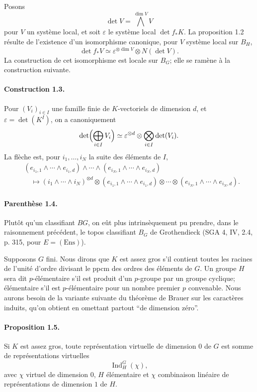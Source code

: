 \documentclass[10pt]{article}
\newcommand{\Ind}{\operatorname{Ind}}
\begin{document}
Posons
\[
\det V=\bigwedge^{\dim V}V
\]
pour \(V\) un système local, et soit \(\varepsilon\) le système local \(\det f_*K\). La proposition 1.2 résulte de l'existence d'un isomorphisme canonique, pour \(V\) système local sur \(B_H\),
\[
\det f_*V\simeq \varepsilon^{\otimes\dim V}\otimes N(\det V).
\]
La construction de cet isomorphisme est locale sur \(B_G\); elle se ramène à la construction suivante.

\paragraph{Construction 1.3.} Pour \((V_i)_{i\in I}\) une famille finie de \(K\)-vectoriels de dimension \(d\), et \(\varepsilon=\det(K^I)\), on a canoniquement
\[
\det\Bigl(\bigoplus_{i\in I}V_i\Bigr)\simeq
\varepsilon^{\otimes d}\otimes\bigotimes_{i\in I}\det(V_i).
\]
La flèche est, pour \(i_1,\ldots,i_N\) la suite des éléments de \(I\),
\[
\begin{aligned}
&(e_{i_1,1}\wedge\cdots\wedge e_{i_1,d})\wedge\cdots\wedge
(e_{i_N,1}\wedge\cdots\wedge e_{i_N,d}) \\
&\quad\longmapsto
(i_1\wedge\cdots\wedge i_N)^{\otimes d}\otimes
(e_{i_1,1}\wedge\cdots\wedge e_{i_1,d})\otimes\cdots\otimes
(e_{i_N,1}\wedge\cdots\wedge e_{i_N,d}).
\end{aligned}
\]

\paragraph{Parenthèse 1.4.} Plutôt qu'un classifiant \(BG\), on eût plus intrinsèquement pu prendre, dans le raisonnement précédent, le topos classifiant \(B_G\) de Grothendieck (SGA 4, IV, 2.4, p. 315, pour \(E=(\mathrm{Ens})\)).

Supposons \(G\) fini. Nous dirons que \(K\) est assez gros s'il contient toutes les racines de l'unité d'ordre divisant le ppcm des ordres des éléments de \(G\). Un groupe \(H\) sera dit \(p\)-élémentaire s'il est produit d'un \(p\)-groupe par un groupe cyclique; élémentaire s'il est \(p\)-élémentaire pour un nombre premier \(p\) convenable. Nous aurons besoin de la variante suivante du théorème de Brauer sur les caractères induits, qu'on obtient en omettant partout ``de dimension zéro''.

\paragraph{Proposition 1.5.} Si \(K\) est assez gros, toute représentation virtuelle de dimension \(0\) de \(G\) est somme de représentations virtuelles
\[
\Ind_H^G(\chi),
\]
avec \(\chi\) virtuel de dimension \(0\), \(H\) élémentaire et \(\chi\) combinaison linéaire de représentations de dimension \(1\) de \(H\).
\end{document}
